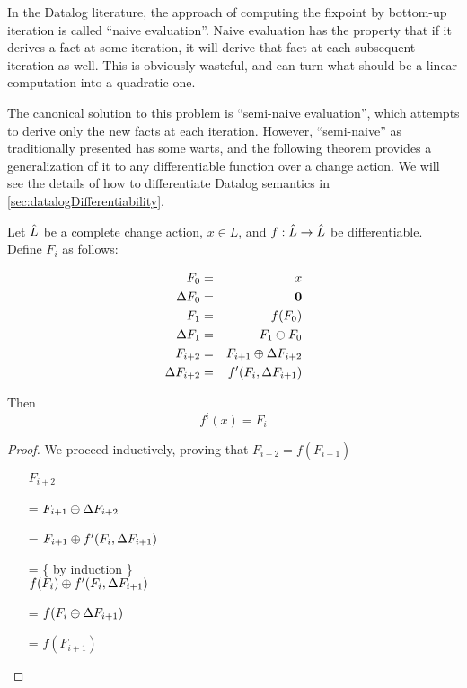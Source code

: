 In the Datalog literature, the approach of computing the fixpoint by bottom-up
iteration is called ``naive evaluation''. Naive evaluation has the property that
if it derives a fact at some iteration, it will derive that fact at each
subsequent iteration as well. This is obviously wasteful, and can turn what
should be a linear computation into a quadratic one.

The canonical solution to this problem is ``semi-naive evaluation'', which
attempts to derive only the new facts at each iteration. However, ``semi-naive''
as traditionally presented has some warts, and
the following theorem provides a generalization of it to any differentiable function over a
change action. We will see the details of how to differentiate Datalog
semantics in \cref{sec:datalogDifferentiability}.

\begin{thm}
\label{thm:diffIter}
  Let $\hat{L}$ be a complete change action, $x \in L$, and $f: \hat{L} \rightarrow \hat{L}$ be differentiable. Define $F_i$ as follows:

  \begin{eqnarray*}
  F_0 & = & x\\
  \Delta F_0 & = & \textbf{0} \\
  F_1 & = & f(F_0)\\
  \Delta F_1 & = & F_1 \ominus F_0 \\
  F_{i+2} & = & F_{i+1} \oplus \Delta F_{i+2} \\
  \Delta F_{i+2} & = & f'(F_i, \Delta F_{i+1}) \\
  \end{eqnarray*}

  Then 
  $$f^i(x) = F_i$$
\end{thm}

\ifproofs
\begin{proof}
We proceed inductively, proving that $F_{i+2} = f(F_{i+1})$

\begin{itemize}
\item[ ]$F_{i+2}$
\item[=]
$
F_{i+1} \oplus \Delta F_{i+2}
$
\item[=]
$
F_{i+1} \oplus f'( F_i, \Delta F_{i+1})
$
\item[=] \{ by induction \}\\
$
f(F_i) \oplus f'(F_i, \Delta F_{i+1})
$
\item[=]
$
f(F_i \oplus \Delta F_{i+1})
$ 
\item[=]
$f(F_{i+1})$
\end{itemize}
\end{proof}
\fi

